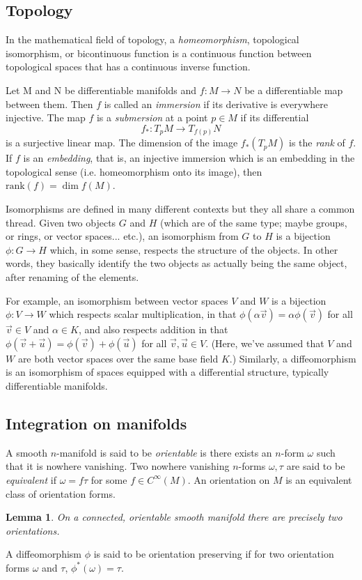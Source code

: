 \documentclass{article}
\theoremstyle{plain}
\newtheorem{lem}[teo]{Lemma}
\theoremstyle{definition}
\numberwithin{equation}{section}
\begin{document}
\subsection{Topology}
In the mathematical field of topology, a \textit{homeomorphism}, topological isomorphism, or bicontinuous function is a continuous function between topological spaces that has a continuous inverse function.

Let M and N be differentiable manifolds and $f: M\to N$ be a differentiable map between them. Then $f$ is called an \textit{immersion} if its derivative is everywhere injective. The map $f$ is a \textit{submersion} at a point $p\in M$ if its differential
\[
f_*:T_pM\to T_{f(p)}N
\]
is a surjective linear map. The dimension of the image $f_*(T_pM)$ is the \textit{rank} of $f$. If $f$ is an \textit{embedding}, that is, an injective immersion which is an embedding in the topological sense (i.e. homeomorphism onto its image), then $\mathrm{rank}(f)=\dim f(M)$.

Isomorphisms are defined in many different contexts but they all share a common thread. Given two objects $G$ and $H$ (which are of the same type; maybe groups, or rings, or vector spaces... etc.), an isomorphism from $G$ to $H$ is a bijection $\phi:G\to H$ which, in some sense, respects the structure of the objects. In other words, they basically identify the two objects as actually being the same object, after renaming of the elements.

For example, an isomorphism between vector spaces $V$ and $W$ is a bijection $\phi:V\to W$ which respects scalar multiplication, in that $\phi(\alpha\vec{v})=\alpha\phi(\vec{v})$ for all $\vec{v}\in V$ and $\alpha\in K$, and also respects addition in that $\phi(\vec{v}+\vec{u})=\phi(\vec{v})+\phi(\vec{u})$ for all $\vec{v},\vec{u}\in V$. (Here, we've assumed that $V$ and $W$ are both vector spaces over the same base field $K$.) Similarly, a diffeomorphism is an isomorphism of spaces equipped with a differential structure, typically differentiable manifolds.

\subsection{Integration on manifolds}
A smooth $n$-manifold is said to be \textit{orientable} is there exists an $n$-form $\omega$ such that it is nowhere vanishing. Two nowhere vanishing $n$-forms $\omega,\tau$ are said to be \textit{equivalent} if $\omega=f\tau$ for some $f\in C^\infty(M)$. An orientation on $M$ is an equivalent class of orientation forms.
\begin{lem}
On a connected, orientable smooth manifold there are precisely two orientations.
\end{lem}
A diffeomorphism $\phi$ is said to be orientation preserving if for two orientation forms $\omega$ and $\tau$, $\phi^*(\omega)=\tau$. 
\end{document}
